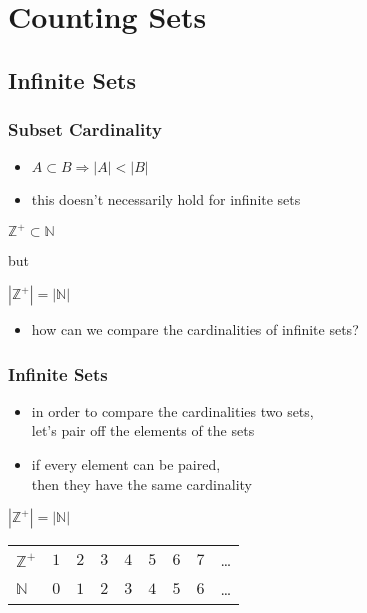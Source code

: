 \documentclass[dvipsnames]{beamer}
\begin{document}
\section{Counting Sets}

\subsection{Infinite Sets}

\begin{frame}
  \frametitle{Subset Cardinality}

  \begin{itemize}
    \item $A \subset B \Rightarrow |A| < |B|$

    \pause
    \item this doesn't necessarily hold for infinite sets
  \end{itemize}

  \begin{example}
$\mathbb{Z}^+ \subset \mathbb{N}$

\smallskip
but

\smallskip
$|\mathbb{Z}^+| = |\mathbb{N}|$
  \end{example}

  \pause
  \begin{itemize}
    \item how can we compare the cardinalities of infinite sets?
  \end{itemize}
\end{frame}

\begin{frame}
  \frametitle{Infinite Sets}

  \begin{itemize}
    \item in order to compare the cardinalities two sets,\\
      let's pair off the elements of the sets
    \item if every element can be paired,\\
      then they have the same cardinality
  \end{itemize}

  \pause
  \begin{block}{$|\mathbb{Z}^+| = |\mathbb{N}|$}
    \begin{tabular}{lcccccccc}
      $\mathbb{Z}^+$ & $1$ & $2$ & $3$ & $4$ & $5$ & $6$ & $7$ & \ldots\\
      $\mathbb{N}$   & $0$ & $1$ & $2$ & $3$ & $4$ & $5$ & $6$ & \ldots\\
    \end{tabular}
  \end{block}
\end{frame}
\end{document}
